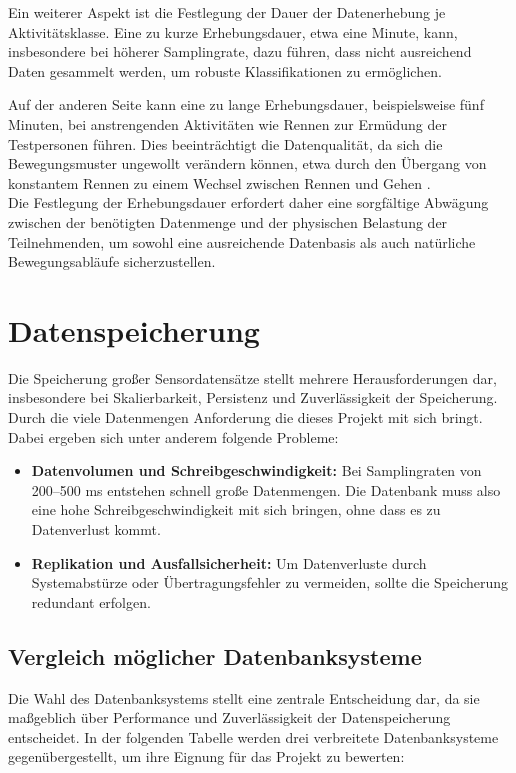 Ein weiterer Aspekt ist die Festlegung der Dauer der Datenerhebung je Aktivitätsklasse. Eine zu kurze Erhebungsdauer, etwa eine Minute, kann, insbesondere bei höherer Samplingrate, dazu führen, dass nicht ausreichend Daten gesammelt werden, um robuste Klassifikationen zu ermöglichen.

Auf der anderen Seite kann eine zu lange Erhebungsdauer, beispielsweise fünf Minuten, bei anstrengenden Aktivitäten wie Rennen zur Ermüdung der Testpersonen führen. Dies beeinträchtigt die Datenqualität, da sich die Bewegungsmuster ungewollt verändern können, etwa durch den Übergang von konstantem Rennen zu einem Wechsel zwischen Rennen und Gehen \cite{long2013walking}.\\

Die Festlegung der Erhebungsdauer erfordert daher eine sorgfältige Abwägung zwischen der benötigten Datenmenge und der physischen Belastung der Teilnehmenden, um sowohl eine ausreichende Datenbasis als auch natürliche Bewegungsabläufe sicherzustellen.

\section{Datenspeicherung}
\label{sec:database}
Die Speicherung großer Sensordatensätze stellt mehrere Herausforderungen dar, insbesondere bei Skalierbarkeit, Persistenz und Zuverlässigkeit der Speicherung. Durch die viele Datenmengen Anforderung die dieses Projekt mit sich bringt.\\
Dabei ergeben sich unter anderem folgende Probleme:
\begin{itemize}
	\item \textbf{Datenvolumen und Schreibgeschwindigkeit:} Bei Samplingraten von 200--500 ms entstehen schnell große Datenmengen. Die Datenbank muss also eine hohe Schreibgeschwindigkeit mit sich bringen, ohne dass es zu Datenverlust kommt.
	\item \textbf{Replikation und Ausfallsicherheit:} Um Datenverluste durch Systemabstürze oder Übertragungsfehler zu vermeiden, sollte die Speicherung redundant erfolgen.
\end{itemize}

\subsection{Vergleich möglicher Datenbanksysteme}

Die Wahl des Datenbanksystems stellt eine zentrale Entscheidung dar, da sie maßgeblich über Performance und Zuverlässigkeit der Datenspeicherung entscheidet. In der folgenden Tabelle werden drei verbreitete Datenbanksysteme gegenübergestellt, um ihre Eignung für das Projekt zu bewerten:

